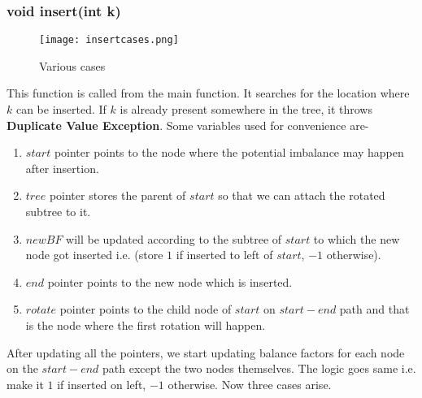 \documentclass{article}
\begin{document}
\subsubsection{void insert(int k)}
\begin{figure}
\texttt{[image: insertcases.png]}
\caption{Various cases}
\label{fig:insert}
\end{figure}
This function is called from the main function. It searches for the location where $k$ can be inserted. If $k$ is already present somewhere in the tree, it throws \textbf{Duplicate Value Exception}.\newline
Some variables used for convenience are-
\begin{enumerate}
\item \textbf{$start$} pointer points to the node where the potential imbalance may happen after insertion.
\item \textbf{$tree$} pointer stores the parent of $start$ so that we can attach the rotated subtree to it.
\item \textbf{$newBF$} will be updated according to the subtree of $start$ to which the new node got inserted i.e. (store $1$ if inserted to left of $start$, $-1$ otherwise).
\item \textbf{$end$} pointer points to the new node which is inserted.
\item \textbf{$rotate$} pointer points to the child node of $start$ on $start-end$ path and that is the node where the first rotation will happen.
\end{enumerate}
After updating all the pointers, we start updating balance factors for each node on the $start-end$ path except the two nodes themselves. The logic goes same i.e. make it $1$ if inserted on left, $-1$ otherwise.\newline
Now three cases arise.
\end{document}
